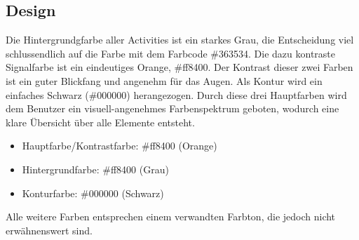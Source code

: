 \documentclass[FIPLY_base.tex]{subfiles}
\begin{document}
	\subsection{ Design}
	Die Hintergrundgfarbe aller Activities ist ein starkes Grau, die Entscheidung viel schlussendlich auf die Farbe mit dem Farbcode \#363534. Die dazu kontraste Signalfarbe ist ein eindeutiges Orange, \#ff8400. Der Kontrast dieser zwei Farben ist ein guter Blickfang und angenehm für das Augen. Als Kontur wird ein einfaches Schwarz (\#000000) herangezogen. Durch diese drei Hauptfarben wird dem Benutzer ein visuell-angenehmes Farbenspektrum geboten, wodurch eine klare Übersicht über alle Elemente entsteht.
	\begin{itemize}
	 	\item Hauptfarbe/Kontrastfarbe: \#ff8400 (Orange)
	 	\item Hintergrundfarbe: \#ff8400 (Grau)
	 	\item Konturfarbe: \#000000 (Schwarz)
	\end{itemize}
	Alle weitere Farben entsprechen einem verwandten Farbton, die jedoch nicht erwähnenswert sind.
	
\end{document}
